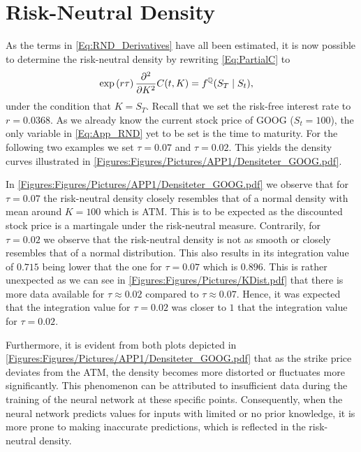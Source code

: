 \section{Risk-Neutral Density}\label{Sec.App:RND}
As the terms in \eqref{Eq:RND_Derivatives} have all been estimated, it is now possible to determine the risk-neutral density by rewriting \eqref{Eq:PartialC} to
\begin{align}\label{Eq:App_RND}
    \exp\left(r\tau\right)\frac{\partial^2}{\partial K^2}C(t,K) &= f^{\mathbb{Q}}(S_T\mid S_t),
\end{align}
under the condition that $K=S_T$. Recall that we set the risk-free interest rate to $r=0.0368$. As we already know the current stock price of GOOG ($S_t=100$), the only variable in \eqref{Eq:App_RND} yet to be set is the time to maturity. For the following two examples we set $\tau=0.07$ and $\tau=0.02$. This yields the density curves illustrated in \autoref{Figures:Figures/Pictures/APP1/Densiteter_GOOG.pdf}.


In \autoref{Figures:Figures/Pictures/APP1/Densiteter_GOOG.pdf} we observe that for $\tau=0.07$ the risk-neutral density closely resembles that of a normal density with mean around $K=100$ which is ATM. This is to be expected as the discounted stock price is a martingale under the risk-neutral measure. Contrarily, for $\tau=0.02$ we observe that the risk-neutral density is not as smooth or closely resembles that of a normal distribution. This also results in its integration value of $0.715$ being lower that the one for $\tau=0.07$ which is $0.896$. This is rather unexpected as we can see in \autoref{Figures:Figures/Pictures/KDist.pdf} that there is more data available for $\tau\approx0.02$ compared to $\tau\approx0.07$. Hence, it was expected that the integration value for $\tau=0.02$ was closer to $1$ that the integration value for $\tau=0.02$.

Furthermore, it is evident from both plots depicted in \autoref{Figures:Figures/Pictures/APP1/Densiteter_GOOG.pdf} that as the strike price deviates from the ATM, the density becomes more distorted or fluctuates more significantly. This phenomenon can be attributed to insufficient data during the training of the neural network at these specific points. Consequently, when the neural network predicts values for inputs with limited or no prior knowledge, it is more prone to making inaccurate predictions, which is reflected in the risk-neutral density.

